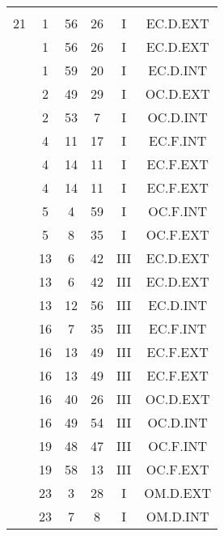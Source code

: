 \documentclass[12pt, a4paper]{article}
\begin{document}
\begin{multicols}{3}
{\begin{tabular}{c c c c c c}
	 	 	 	 & & & & & \\%
	 	 	 	21 & 1 & 56 & 26 & I & EC.D.EXT\\%
	 	 	 	 & 1 & 56 & 26 & I & EC.D.EXT\\%
	 	 	 	 & 1 & 59 & 20 & I & EC.D.INT\\%
	 	 	 	 & 2 & 49 & 29 & I & OC.D.EXT\\%
	 	 	 	 & 2 & 53 & 7 & I & OC.D.INT\\%
	 	 	 	 & 4 & 11 & 17 & I & EC.F.INT\\%
	 	 	 	 & 4 & 14 & 11 & I & EC.F.EXT\\%
	 	 	 	 & 4 & 14 & 11 & I & EC.F.EXT\\%
	 	 	 	 & 5 & 4 & 59 & I & OC.F.INT\\%
	 	 	 	 & 5 & 8 & 35 & I & OC.F.EXT\\%
	 	 	 	 & 13 & 6 & 42 & III & EC.D.EXT\\%
	 	 	 	 & 13 & 6 & 42 & III & EC.D.EXT\\%
	 	 	 	 & 13 & 12 & 56 & III & EC.D.INT\\%
	 	 	 	 & 16 & 7 & 35 & III & EC.F.INT\\%
	 	 	 	 & 16 & 13 & 49 & III & EC.F.EXT\\%
	 	 	 	 & 16 & 13 & 49 & III & EC.F.EXT\\%
	 	 	 	 & 16 & 40 & 26 & III & OC.D.EXT\\%
	 	 	 	 & 16 & 49 & 54 & III & OC.D.INT\\%
	 	 	 	 & 19 & 48 & 47 & III & OC.F.INT\\%
	 	 	 	 & 19 & 58 & 13 & III & OC.F.EXT\\%
	 	 	 	 & 23 & 3 & 28 & I & OM.D.EXT\\%
	 	 	 	 & 23 & 7 & 8 & I & OM.D.INT\\%

\end{tabular}}
\end{multicols}
\end{document}
